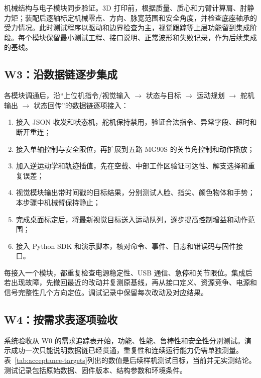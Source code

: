 机械结构与电子模块同步验证。3D 打印前，根据质量、质心和力臂计算肩、肘静力矩；装配后逐轴标定机械零点、方向、脉宽范围和安全角度，并检查底座轴承的受力情况。此时测试程序以驱动和边界检查为主，视觉跟踪等上层功能留到集成阶段。每个模块保留最小测试工程、接口说明、正常波形和失败记录，作为后续集成的基线。

\subsection{W3：沿数据链逐步集成}

各模块调通后，沿“上位机指令/视觉输入 $\rightarrow$ 状态与目标 $\rightarrow$ 运动规划 $\rightarrow$ 舵机输出 $\rightarrow$ 状态回传”的数据链逐项接入：

\begin{enumerate}
  \item 接入 JSON 收发和状态机，舵机保持禁用，验证合法指令、异常字段、超时和断开重连；
  \item 接入单轴控制与安全限位，再扩展到五路 MG90S 的关节角控制和动作播放；
  \item 加入逆运动学和轨迹插值，先在空载、中部工作区验证可达性、解支选择和重复误差；
  \item 视觉模块输出带时间戳的目标结果，分别测试人脸、指尖、颜色物体和手势；本步骤中机械臂保持静止；
  \item 完成桌面标定后，将最新视觉目标送入运动队列，逐步提高控制增益和动作范围；
  \item 接入 Python SDK 和演示脚本，核对命令、事件、日志和错误码与固件接口。
\end{enumerate}

每接入一个模块，都重复检查电源稳定性、USB 通信、急停和关节限位。集成后若出现故障，先撤回最近的改动并复测原基线，再从接口定义、资源竞争、电源和信号完整性几个方向定位。调试记录中保留每次改动及对应结果。

\subsection{W4：按需求表逐项验收}

系统验收从 W0 的需求追踪表开始，功能、性能、鲁棒性和安全性分别测试。演示成功一次只能说明数据链已经贯通，重复性和连续运行能力仍需单独测量。表~\ref{tab:acceptance-targets}列出的数值是后续样机测试目标，当前并无实测结论。测试记录包括原始数据、固件版本、结构参数和环境条件。

